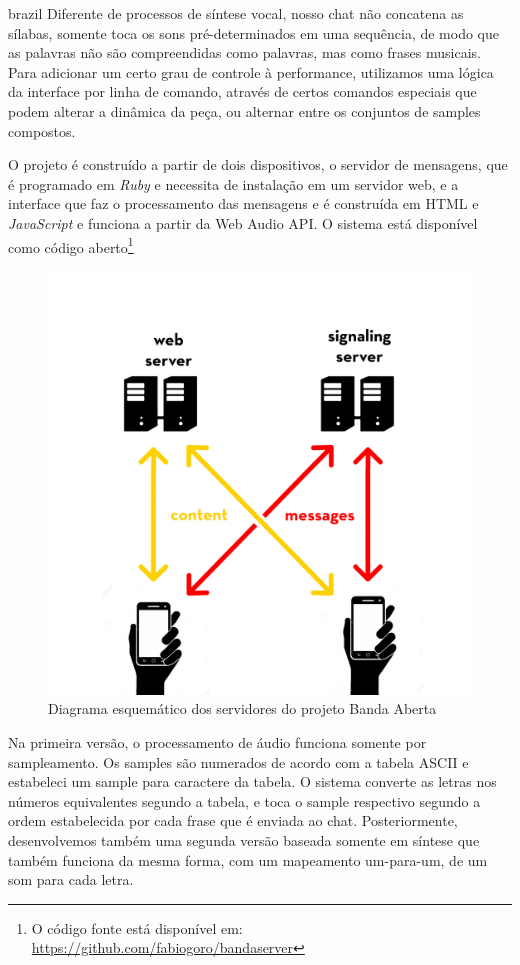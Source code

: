 \begin{otherlanguage*}{brazil}
Diferente de processos de síntese vocal, nosso chat não concatena as sílabas, somente toca os sons pré-determinados em uma sequência, de modo que as palavras não são compreendidas como palavras, mas como frases musicais. Para adicionar um certo grau de controle à performance, utilizamos uma lógica da interface por linha de comando, através de certos comandos especiais que podem alterar a dinâmica da peça, ou alternar entre os conjuntos de samples compostos.

O projeto é construído a partir de dois dispositivos, o servidor de mensagens, que é programado em \emph{Ruby} e necessita de instalação em um servidor web, e a interface que faz o processamento das mensagens e é construída em HTML e \emph{JavaScript} e funciona a partir da Web Audio API. O sistema está disponível como código aberto\footnote{O código fonte está disponível em: \url{https://github.com/fabiogoro/bandaserver}}   

\begin{figure}[htb]
    \caption{\label{bandaabertaserver}Diagrama esquemático dos servidores do projeto Banda Aberta}
    \begin{center}
        \includegraphics[width=0.5\linewidth]{pictures/server.jpg}
    \end{center}
\end{figure}

Na primeira versão, o processamento de áudio funciona somente por sampleamento. Os samples são numerados de acordo com a tabela ASCII e estabeleci um sample para caractere da tabela. O sistema converte as letras nos números equivalentes segundo a tabela, e toca o sample respectivo segundo a ordem estabelecida por cada frase que é enviada ao chat. Posteriormente, desenvolvemos também uma segunda versão baseada somente em síntese que também funciona da mesma forma, com um mapeamento um-para-um, de um som para cada letra.


\end{otherlanguage*}
